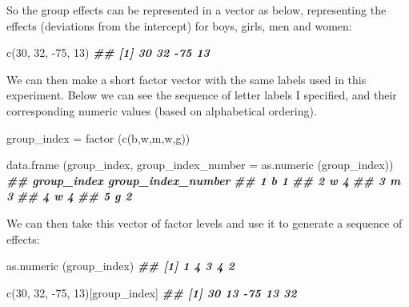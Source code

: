 \documentclass[
]{book}
\newenvironment{Shaded}{\begin{snugshade}}{\end{snugshade}}
\newcommand{\AttributeTok}[1]{\textcolor[rgb]{0.77,0.63,0.00}{#1}}
\newcommand{\DecValTok}[1]{\textcolor[rgb]{0.00,0.00,0.81}{#1}}
\newcommand{\DocumentationTok}[1]{\textcolor[rgb]{0.56,0.35,0.01}{\textbf{\textit{#1}}}}
\newcommand{\FunctionTok}[1]{\textcolor[rgb]{0.00,0.00,0.00}{#1}}
\newcommand{\NormalTok}[1]{#1}
\newcommand{\OtherTok}[1]{\textcolor[rgb]{0.56,0.35,0.01}{#1}}
\newcommand{\SpecialCharTok}[1]{\textcolor[rgb]{0.00,0.00,0.00}{#1}}
\newcommand{\StringTok}[1]{\textcolor[rgb]{0.31,0.60,0.02}{#1}}
\begin{document}
So the group effects can be represented in a vector as below, representing the effects (deviations from the intercept) for boys, girls, men and women:

\begin{Shaded}
\begin{Highlighting}[]
\FunctionTok{c}\NormalTok{(}\DecValTok{30}\NormalTok{, }\DecValTok{32}\NormalTok{, }\SpecialCharTok{{-}}\DecValTok{75}\NormalTok{, }\DecValTok{13}\NormalTok{)}
\DocumentationTok{\#\# [1]  30  32 {-}75  13}
\end{Highlighting}
\end{Shaded}

We can then make a short factor vector with the same labels used in this experiment. Below we can see the sequence of letter labels I specified, and their corresponding numeric values (based on alphabetical ordering).

\begin{Shaded}
\begin{Highlighting}[]
\NormalTok{group\_index }\OtherTok{=} \FunctionTok{factor}\NormalTok{ (}\FunctionTok{c}\NormalTok{(}\StringTok{\textquotesingle{}b\textquotesingle{}}\NormalTok{,}\StringTok{\textquotesingle{}w\textquotesingle{}}\NormalTok{,}\StringTok{\textquotesingle{}m\textquotesingle{}}\NormalTok{,}\StringTok{\textquotesingle{}w\textquotesingle{}}\NormalTok{,}\StringTok{\textquotesingle{}g\textquotesingle{}}\NormalTok{))}

\FunctionTok{data.frame}\NormalTok{ (group\_index, }\AttributeTok{group\_index\_number =} \FunctionTok{as.numeric}\NormalTok{ (group\_index))}
\DocumentationTok{\#\#   group\_index group\_index\_number}
\DocumentationTok{\#\# 1           b                  1}
\DocumentationTok{\#\# 2           w                  4}
\DocumentationTok{\#\# 3           m                  3}
\DocumentationTok{\#\# 4           w                  4}
\DocumentationTok{\#\# 5           g                  2}
\end{Highlighting}
\end{Shaded}

We can then take this vector of factor levels and use it to generate a sequence of effects:

\begin{Shaded}
\begin{Highlighting}[]
\FunctionTok{as.numeric}\NormalTok{ (group\_index)}
\DocumentationTok{\#\# [1] 1 4 3 4 2}

\FunctionTok{c}\NormalTok{(}\DecValTok{30}\NormalTok{, }\DecValTok{32}\NormalTok{, }\SpecialCharTok{{-}}\DecValTok{75}\NormalTok{, }\DecValTok{13}\NormalTok{)[group\_index]}
\DocumentationTok{\#\# [1]  30  13 {-}75  13  32}
\end{Highlighting}
\end{Shaded}
\end{document}
